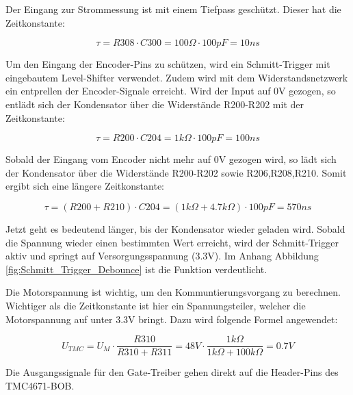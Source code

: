 Der Eingang zur Strommessung ist mit einem Tiefpass geschützt. Dieser hat die Zeitkonstante:

\begin{equation}
\tau = R308 \cdot C300 = 100\Omega \cdot 100pF = 10ns
\end{equation}


Um den Eingang der Encoder-Pins zu schützen, wird ein Schmitt-Trigger mit eingebautem Level-Shifter verwendet. Zudem wird mit dem Widerstandsnetzwerk ein entprellen der Encoder-Signale erreicht. Wird der Input auf 0V gezogen, so entlädt sich der Kondensator über die Widerstände R200-R202 mit der Zeitkonstante:

\begin{equation}
\tau = R200 \cdot C204 = 1k\Omega \cdot 100pF = 100ns
\end{equation}

Sobald der Eingang vom Encoder nicht mehr auf 0V gezogen wird, so lädt sich der Kondensator über die Widerstände R200-R202 sowie R206,R208,R210. Somit ergibt sich eine längere Zeitkonstante:

\begin{equation}
\tau = (R200 + R210) \cdot C204 = (1k\Omega + 4.7k\Omega) \cdot 100pF = 570ns
\end{equation}

Jetzt geht es bedeutend länger, bis der Kondensator wieder geladen wird. Sobald die Spannung wieder einen bestimmten Wert erreicht, wird der Schmitt-Trigger aktiv und springt auf Versorgungsspannung (3.3V). Im Anhang Abbildung \ref{fig:Schmitt_Trigger_Debounce} ist die Funktion verdeutlicht.


Die Motorspannung ist wichtig, um den Kommuntierungsvorgang zu berechnen. Wichtiger als die Zeitkonstante ist hier ein Spannungsteiler, welcher die Motorspannung auf unter 3.3V bringt. Dazu wird folgende Formel angewendet:

\begin{equation}
U_{TMC} = U_M \cdot \frac{R310}{R310 + R311} = 48V \cdot \frac{1k\Omega}{1k\Omega + 100k\Omega} = 0.7V
\end{equation}


Die Ausgangssignale für den Gate-Treiber gehen direkt auf die Header-Pins des TMC4671-BOB.

